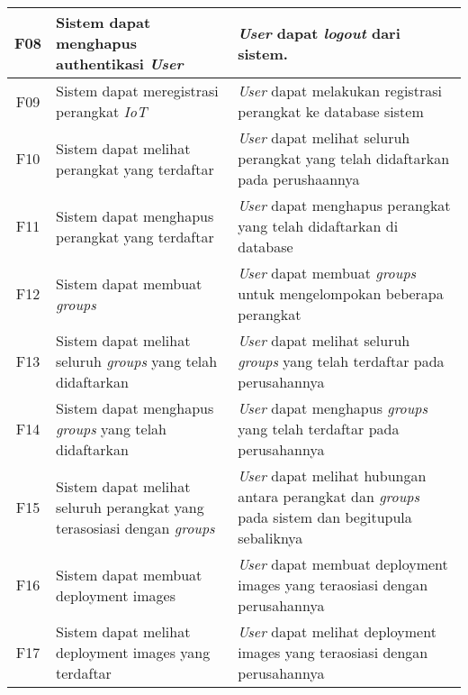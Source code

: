 \begin{table}
\begin{tabular}{|c|p{4.5cm}|p{8cm}|}
    \hline
    F08 & Sistem dapat menghapus authentikasi \textit{User}                              & \textit{User} dapat \textit{logout} dari sistem.                                                                \\
    \hline
    F09 & Sistem dapat meregistrasi perangkat \textit{IoT}                               & \textit{User} dapat melakukan registrasi perangkat ke database sistem                                           \\
    \hline
    F10 & Sistem dapat melihat perangkat yang terdaftar                                  & \textit{User} dapat melihat seluruh perangkat yang telah didaftarkan pada perushaannya                          \\
    \hline
    F11 & Sistem dapat menghapus perangkat yang terdaftar                                & \textit{User} dapat menghapus perangkat yang telah didaftarkan di database                                      \\
    \hline
    F12 & Sistem dapat membuat \textit{groups}                                           & \textit{User} dapat membuat \textit{groups} untuk mengelompokan beberapa perangkat                              \\
    \hline
    F13 & Sistem dapat melihat seluruh \textit{groups} yang telah didaftarkan            & \textit{User} dapat melihat seluruh \textit{groups} yang telah terdaftar pada perusahannya                      \\
    \hline
    F14 & Sistem dapat menghapus \textit{groups} yang telah didaftarkan                  & \textit{User} dapat menghapus \textit{groups} yang telah terdaftar pada perusahannya                            \\
    \hline
    F15 & Sistem dapat melihat seluruh perangkat yang terasosiasi dengan \textit{groups} & \textit{User} dapat melihat hubungan antara perangkat dan \textit{groups} pada sistem dan begitupula sebaliknya \\
    \hline
    F16 & Sistem dapat membuat deployment images                                         & \textit{User} dapat membuat deployment images yang teraosiasi dengan perusahannya                               \\
    \hline
    F17 & Sistem dapat melihat deployment images yang terdaftar                          & \textit{User} dapat melihat deployment images yang teraosiasi dengan perusahannya                               \\
    \hline
  \end{tabular}
\end{table}

